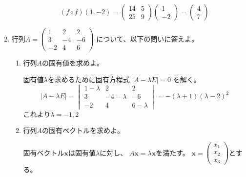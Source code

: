\documentclass[10pt,a4paper]{ltjsarticle}
\begin{document}
\begin{enumerate}
\begin{enumerate}
              \begin{equation}
               (f\circ f)(1,-2)=
                \begin{pmatrix} 14&5\\ 25&9\end{pmatrix}
                \begin{pmatrix} 1\\ -2\end{pmatrix}
                =\begin{pmatrix} 4\\ 7\end{pmatrix}
              \end{equation}
       \end{enumerate}
       \hrulefill
 \item 行列$A=\begin{pmatrix} 1&2&2\\ 3&-4&-6\\ -2&4&6\end{pmatrix}$
       について、以下の問いに答えよ。
       \begin{enumerate}
        \item 行列$A$の固有値を求めよ。

              \dotfill

              固有値$\lambda$を求めるために固有方程式
              $\lvert A -\lambda E \rvert =0$
              を解く。
              \begin{equation}
               \lvert A -\lambda E \rvert
                =
               \begin{vmatrix}
               1-\lambda &2&2\\ 3&-4-\lambda &-6\\ -2&4&6-\lambda
               \end{vmatrix}
               =-(λ+1)(λ-2)^2
              \end{equation}
              これより$\lambda =-1, 2$


              \hrulefill
        \item 行列$A$の固有ベクトルを求めよ。

              \dotfill

              固有ベクトル$\bm{x}$は固有値$\lambda$に対し、
              $A\bm{x}=\lambda\bm{x}$を満たす。
              $\bm{x}=\begin{pmatrix} x_1\\ x_2\\ x_3\end{pmatrix}$とする。


\end{enumerate}
\end{enumerate}
\end{document}

